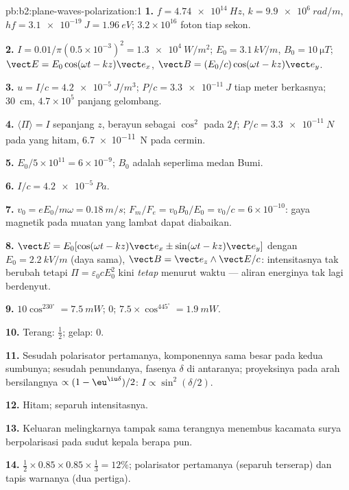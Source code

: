 \begin{solution}{pb:b2:plane-waves-polarization:1}
\textbf{1.} $f = \qty{4.74e14}{Hz}$, $k = \qty{9.9e6}{rad/m}$, $hf = \qty{3.1e-19}{J} =
\qty{1.96}{eV}$; $3.2 \times 10^{16}$ foton tiap sekon.

\textbf{2.} $I = 0.01/\pi(0.5 \times 10^{-3})^2 = \qty{1.3e4}{W/m^2}$; $E_0 = \qty{3.1}{kV/m}$,
$B_0 = \qty{10}{\micro T}$; $\vect E = E_0\cos(\omega t - kz)\vect e_x$, $\vect B = (E_0/c)\cos(\omega t
- kz)\vect e_y$.

\textbf{3.} $u = I/c = \qty{4.2e-5}{J/m^3}$; $P/c = \qty{3.3e-11}{J}$ tiap meter
berkasnya; \qty{30}{cm}, $4.7 \times 10^5$ panjang gelombang.

\textbf{4.} $\langle\Pi\rangle = I$ sepanjang $z$, berayun sebagai $\cos^2$ pada $2f$;
$P/c = \qty{3.3e-11}{N}$ pada yang hitam, \qty{6.7e-11}{N} pada cermin.

\textbf{5.} $E_0/5 \times 10^{11} = 6 \times 10^{-9}$; $B_0$ adalah seperlima medan
Bumi.

\textbf{6.} $I/c = \qty{4.2e-5}{Pa}$.

\textbf{7.} $v_0 = eE_0/m\omega = \qty{0.18}{m/s}$; $F_m/F_e = v_0B_0/E_0 = v_0/c = 6 \times
10^{-10}$: gaya magnetik pada muatan yang lambat dapat diabaikan.

\textbf{8.} $\vect E = E_0[\cos(\omega t - kz)\vect e_x \pm \sin(\omega t - kz)\vect e_y]$ dengan
$E_0 = \qty{2.2}{kV/m}$ (daya sama), $\vect B = \vect e_z\wedge\vect E/c$:
intensitasnya tak berubah tetapi $\Pi = \varepsilon_0cE_0^2$ kini \emph{tetap} menurut
waktu --- aliran energinya tak lagi berdenyut.

\textbf{9.} $10\cos^230^\circ = \qty{7.5}{mW}$; $0$; $7.5 \times \cos^445^\circ = \qty{1.9}{mW}$.

\textbf{10.} Terang: $\tfrac12$; gelap: $0$.

\textbf{11.} Sesudah polarisator pertamanya, komponennya sama besar pada kedua sumbunya;
sesudah penundanya, fasenya $\delta$ di antaranya; proyeksinya pada arah
bersilangnya $\propto(1 - \eu^{\iu\delta})/2$: $I \propto \sin^2(\delta/2)$.

\textbf{12.} Hitam; separuh intensitasnya.

\textbf{13.} Keluaran melingkarnya tampak sama terangnya menembus kacamata surya
berpolarisasi pada sudut kepala berapa pun.

\textbf{14.} $\tfrac12 \times 0.85 \times 0.85 \times \tfrac13 = 12\%$; polarisator pertamanya
(separuh terserap) dan tapis warnanya (dua pertiga).


\end{solution}
